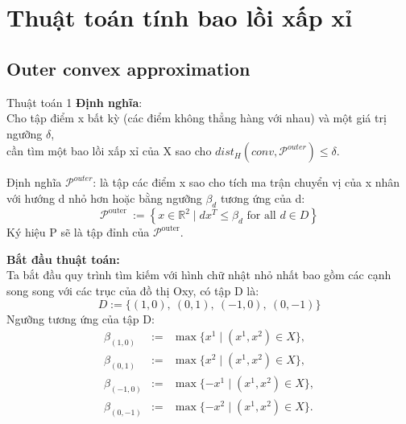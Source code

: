\documentclass[11pt]{beamer}
\theoremstyle{definition}
\theoremstyle{plain}
\theoremstyle{plain}
\theoremstyle{remark}
\begin{document}
\section{Thuật toán tính bao lồi xấp xỉ}
\subsection{Outer convex approximation}
\begin{frame}{Thuật toán 1}
	\textbf{Định nghĩa}: \\
Cho tập điểm x bất kỳ (các điểm không thẳng hàng với nhau) và một giá trị ngưỡng $\delta$,\\
cần tìm một bao lồi xấp xỉ của X sao cho $dist_H(conv, \mathcal{P}^{outer}) \leq \delta$.\\

\end{frame}
\begin{frame}
	Định nghĩa $\mathcal{P}^{outer}$: là tập các điểm x sao cho tích ma trận chuyển vị của x nhân với hướng d nhỏ hơn hoặc bằng ngưỡng $\beta_d$ tương ứng của d:
\begin{equation}
	\mathcal{P}^{\text {outer }}:=\left\{x \in \mathbb{R}^2 \mid d x^T \leq \beta_d \text { for all } d \in D\right\}
\end{equation}
Ký hiệu P sẽ là tập đỉnh của $\mathcal{P}^{\text {outer}}$.
\end{frame}
\begin{frame}
	\textbf{Bắt đầu thuật toán:}\\
	Ta bắt đầu quy trình tìm kiếm với hình chữ nhật nhỏ nhất bao gồm các cạnh song song với các trục của đồ thị Oxy, có tập D là:\\
	\begin{equation}\label{def_D1}
		D := \{(1, 0),\ (0, 1),\ (-1, 0),\ (0, -1)\}
	\end{equation}
	Ngưỡng tương ứng của tập D:
	\begin{equation}\label{def_beta1}
		\begin{array}{lcl}
			\beta_{(1, 0)} &:=& \max\{x^1 \mid (x^1, x^2) \in X\}, \\
			\beta_{(0, 1)} &:=& \max\{x^2 \mid (x^1, x^2) \in X\}, \\
			\beta_{(-1, 0)} &:=& \max\{-x^1 \mid (x^1, x^2) \in X\}, \\
			\beta_{(0, -1)} &:=& \max\{-x^2 \mid (x^1, x^2) \in X\}.
		\end{array}
	\end{equation}
\end{frame}
\end{document}
